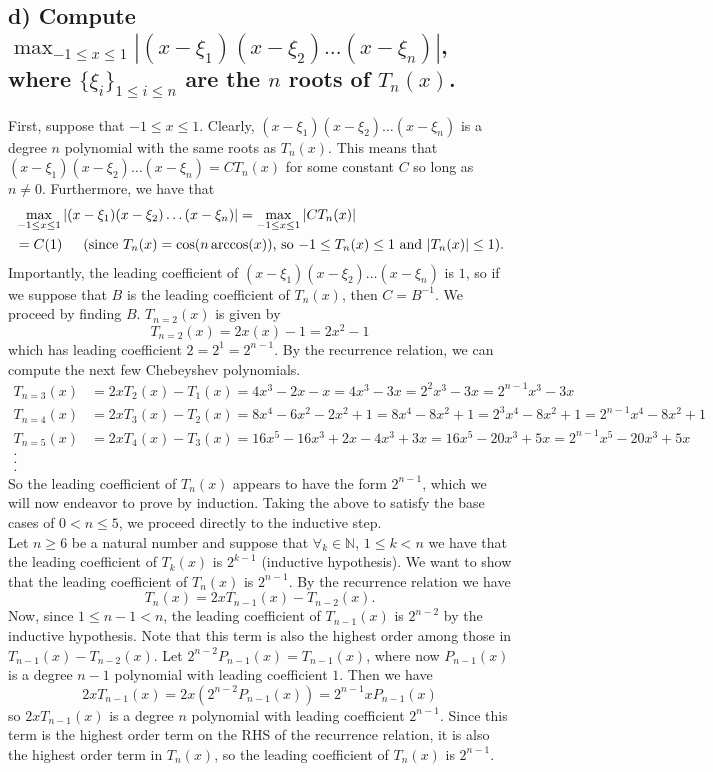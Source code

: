 \documentclass[11pt, letterpaper]{article}
\begin{document}
\subsection*{d) \normalfont Compute $\max_{-1\leq x\leq 1}|(x-\xi_1)(x-\xi_2)\dots(x-\xi_n)|$, where $\{\xi_i\}_{1\leq i\leq n}$ are the $n$ roots of $T_n(x)$.}
First, suppose that $-1\leq x\leq 1$. Clearly, $(x-\xi_1)(x-\xi_2)\dots(x-\xi_n)$ is a degree $n$ polynomial with the same roots as $T_n(x)$. 
This means that $(x-\xi_1)(x-\xi_2)\dots(x-\xi_n)=CT_n(x)$ for some constant $C$ so long as $n\neq 0$. Furthermore, we have that
\begin{align*}
    &\max_{-1\leq x\leq 1}|(x-\xi_1)(x-\xi_2)\dots(x-\xi_n)|=\max_{-1\leq x\leq 1}|CT_n(x)|\\
    &=C(1)\text{\indent (since $T_n(x)=\cos(n\arccos(x))$, so $-1\leq T_n(x)\leq 1$ and $|T_n(x)|\leq 1$).}
\end{align*}
Importantly, the leading coefficient of $(x-\xi_1)(x-\xi_2)\dots(x-\xi_n)$ is $1$, so if we suppose that $B$
is the leading coefficient of $T_n(x)$, then $C=B^{-1}$. We proceed by finding $B$. $T_{n=2}(x)$ is given by
\[T_{n=2}(x)=2x(x)-1=2x^2-1\]
which has leading coefficient $2=2^1=2^{n-1}$. By the recurrence relation, we can compute the next few Chebeyshev polynomials.
\begin{align*}
    T_{n=3}(x)&=2xT_2(x)-T_1(x)=4x^3-2x-x=4x^3-3x=2^2x^3-3x=2^{n-1}x^3-3x\\
    T_{n=4}(x)&=2xT_3(x)-T_2(x)=8x^4-6x^2-2x^2+1=8x^4-8x^2+1=2^3x^4-8x^2+1=2^{n-1}x^4-8x^2+1\\
    T_{n=5}(x)&=2xT_4(x)-T_3(x)=16x^5-16x^3+2x-4x^3+3x=16x^5-20x^3+5x=2^{n-1}x^5-20x^3+5x\\
    .\\
    .\\
    .
\end{align*}
So the leading coefficient of $T_n(x)$ appears to have the form $2^{n-1}$, which we will now endeavor to prove by 
induction. Taking the above to satisfy the base cases of $0<n\leq 5$, we proceed directly to the inductive step.\\

 Let $n\geq 6$ be a natural number and suppose that $\forall_k\in\mathbb{N}$, $1\leq k < n$ we have
that the leading coefficient of $T_k(x)$ is $2^{k-1}$ (inductive hypothesis). We want to show that
the leading coefficient of $T_n(x)$ is $2^{n-1}$. By the recurrence relation we have
\[T_n(x)=2xT_{n-1}(x)-T_{n-2}(x).\]
Now, since $1\leq n-1 < n$, the leading coefficient of $T_{n-1}(x)$ is $2^{n-2}$ by the inductive hypothesis. 
Note that this term is also the highest order among those in $T_{n-1}(x)-T_{n-2}(x)$. Let $2^{n-2}P_{n-1}(x)=T_{n-1}(x)$, where now
$P_{n-1}(x)$ is a degree $n-1$ polynomial with leading coefficient $1$. Then we have
\[2xT_{n-1}(x)=2x(2^{n-2}P_{n-1}(x))=2^{n-1}xP_{n-1}(x)\]
so $2xT_{n-1}(x)$ is a degree $n$ polynomial with leading coefficient $2^{n-1}$. Since this term is the highest order term
on the RHS of the recurrence relation, it is also the highest order term in $T_n(x)$, so the leading coefficient of $T_n(x)$ is
$2^{n-1}$.\\
\end{document}
